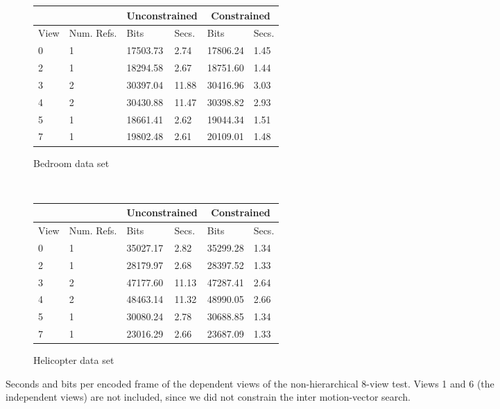 \documentclass[12pt]{article}
\begin{document}
\begin{figure}
\centering\small
\begin{subfigure}{.5\textwidth} \hspace{-.6in}
\begin{tabular}{|l|l|l|l|l|l|}
\multicolumn{2}{c}{} & \multicolumn{2}{c}{Unconstrained} & \multicolumn{2}{c}{Constrained} \\ \hline
View & Num. Refs.    & Bits            & Secs.           & Bits            & Secs.         \\ \hline
0    & 1             & 17503.73        & 2.74            & 17806.24        & 1.45          \\ \hline
2    & 1             & 18294.58        & 2.67            & 18751.60        & 1.44          \\ \hline
3    & 2             & 30397.04        & 11.88           & 30416.96        & 3.03          \\ \hline
4    & 2             & 30430.88        & 11.47           & 30398.82        & 2.93          \\ \hline
5    & 1             & 18661.41        & 2.62            & 19044.34        & 1.51          \\ \hline
7    & 1             & 19802.48        & 2.61            & 20109.01        & 1.48          \\ \hline
\end{tabular}
\caption{Bedroom data set}
\end{subfigure} \\ \vspace{.3in}
\begin{subfigure}{.5\textwidth} \hspace{-.6in}
\begin{tabular}{|l|l|l|l|l|l|}
\multicolumn{2}{c}{} & \multicolumn{2}{c}{Unconstrained} & \multicolumn{2}{c}{Constrained} \\ \hline
View & Num. Refs.    & Bits            & Secs.           & Bits            & Secs.         \\ \hline
0    & 1             & 35027.17        & 2.82            & 35299.28        & 1.34          \\ \hline
2    & 1             & 28179.97        & 2.68            & 28397.52        & 1.33          \\ \hline
3    & 2             & 47177.60        & 11.13           & 47287.41        & 2.64          \\ \hline
4    & 2             & 48463.14        & 11.32           & 48990.05        & 2.66          \\ \hline
5    & 1             & 30080.24        & 2.78            & 30688.85        & 1.34          \\ \hline
7    & 1             & 23016.29        & 2.66            & 23687.09        & 1.33          \\ \hline
\end{tabular}
\caption{Helicopter data set}
\end{subfigure}
\caption{
Seconds and bits per encoded frame of the dependent views of the
non-hierarchical 8-view test. Views 1 and 6 (the independent views) are not
included, since we did not constrain the inter motion-vector search.
}
\end{figure}
\end{document}
